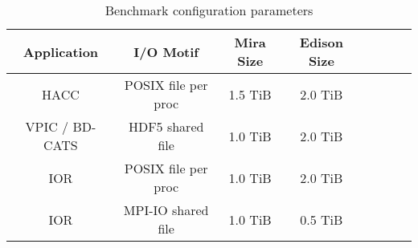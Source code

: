 \begin{table}[h]
\footnotesize
\centering
\caption{Benchmark configuration parameters}
\label{tab:bench-config}
\begin{tabular}{|c|c|c|c|c|c|c|c|}
\hline
\textbf{Application} & \textbf{I/O Motif} & \textbf{Mira Size} & \textbf{Edison Size} \\
\hline
HACC & POSIX file per proc & 1.5 TiB & 2.0 TiB \\
\hline
VPIC / BD-CATS & HDF5 shared file & 1.0 TiB & 2.0 TiB\\
\hline
IOR & POSIX file per proc & 1.0 TiB & 2.0 TiB\\
\hline
IOR & MPI-IO shared file & 1.0 TiB & 0.5 TiB\\
\hline
\end{tabular}
\normalsize
\vspace{-.2in}
\end{table}
